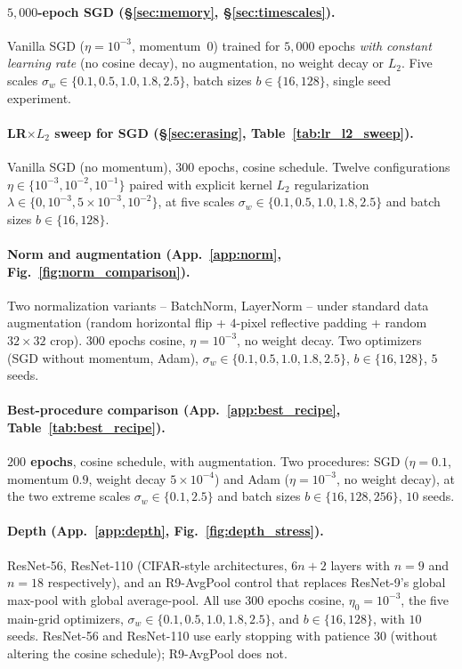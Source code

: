 \documentclass{article}
\begin{document}
\paragraph{$5{,}000$-epoch SGD (\S\ref{sec:memory}, \S\ref{sec:timescales}).}
Vanilla SGD ($\eta=10^{-3}$, momentum~$0$) trained for $5{,}000$ epochs
\emph{with constant learning rate} (no cosine decay), no augmentation,
no weight decay or $L_2$. Five scales $\sigma_w\in\{0.1,0.5,1.0,1.8,2.5\}$,
batch sizes $b\in\{16,128\}$, single seed experiment.

\paragraph{LR$\times L_2$ sweep for SGD (\S\ref{sec:erasing},
Table~\ref{tab:lr_l2_sweep}).}
Vanilla SGD (no momentum), $300$ epochs, cosine schedule. Twelve
configurations $\eta\in\{10^{-3},10^{-2},10^{-1}\}$ paired with explicit
kernel $L_2$ regularization
$\lambda\in\{0,10^{-3},5\!\times\!10^{-3},10^{-2}\}$, at five scales
$\sigma_w\in\{0.1,0.5,1.0,1.8,2.5\}$ and batch sizes $b\in\{16,128\}$.

\paragraph{Norm and augmentation (App.~\ref{app:norm},
Fig.~\ref{fig:norm_comparison}).}
Two normalization variants -- BatchNorm, LayerNorm --
under standard data augmentation (random horizontal flip +
$4$-pixel reflective padding + random $32\!\times\!32$ crop). $300$
epochs cosine, $\eta=10^{-3}$, no weight decay. Two optimizers (SGD
without momentum, Adam), $\sigma_w\in\{0.1,0.5,1.0,1.8,2.5\}$,
$b\in\{16,128\}$, $5$ seeds.

\paragraph{Best-procedure comparison (App.~\ref{app:best_recipe},
Table~\ref{tab:best_recipe}).}
\textbf{$200$ epochs}, cosine schedule, with augmentation.
Two procedures: SGD ($\eta=0.1$, momentum $0.9$, weight decay
$5\!\times\!10^{-4}$) and Adam ($\eta=10^{-3}$, no weight decay), at the
two extreme scales $\sigma_w\in\{0.1,2.5\}$ and batch sizes
$b\in\{16,128,256\}$, $10$ seeds.

\paragraph{Depth (App.~\ref{app:depth}, Fig.~\ref{fig:depth_stress}).}
ResNet-56, ResNet-110 (CIFAR-style architectures, $6n+2$ layers with
$n=9$ and $n=18$ respectively), and an R9-AvgPool control that replaces
ResNet-9's global max-pool with global average-pool. All use $300$
epochs cosine, $\eta_0=10^{-3}$, the five main-grid optimizers,
$\sigma_w\in\{0.1,0.5,1.0,1.8,2.5\}$, and $b\in\{16,128\}$, with $10$
seeds. ResNet-56 and ResNet-110 use early stopping with patience $30$
(without altering the cosine schedule); R9-AvgPool does not.
\end{document}
